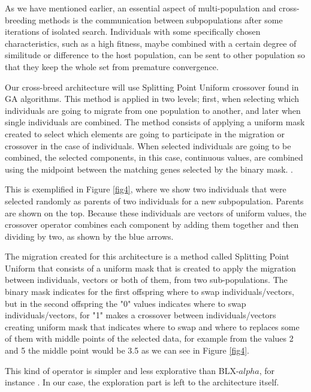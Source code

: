 \documentclass[runningheads]{llncs}
\begin{document}
As we have mentioned earlier, an essential aspect of multi-population
and cross-breeding methods is
the communication between subpopulations after some iterations of isolated
search. Individuals with some specifically chosen characteristics,
such as a high fitness, maybe combined with a certain degree of
similitude or difference to the host population, can be sent to other
population so that they keep the whole set from premature
convergence.

Our cross-breed architecture will use Splitting Point Uniform crossover found in GA
algorithms. %
This method is applied in two levels; first, when selecting which
individuals are going to migrate from one population to another, and later when
single individuals are combined. The method consists of applying a uniform mask
created to select which elements are going to participate in the migration or
crossover in the case of individuals. When selected individuals are going to be
combined, the selected components, in this case, continuous values, are combined
using the midpoint between the matching genes selected by the binary mask.
\cite{Kramer2017,Kaya2011}.

This is exemplified in Figure \ref{fig4}, where we show
two individuals that were selected randomly as parents of two individuals for a
new subpopulation. Parents are shown on the top. Because these individuals are
vectors of uniform values, the crossover operator combines each component by
adding them together and then dividing by two, as shown by the blue arrows.  

The migration created for %
this architecture is a method called Splitting Point
Uniform that consists of a uniform mask that is created to apply the migration
between individuals, vectors or both of them, from two sub-populations. 
The binary mask indicates for the first offspring where to swap individuals/vectors, 
but in the second offspring the "0" values indicates where to swap individuals/vectors, for "1" 
 makes a crossover between individuals/vectors creating uniform mask that indicates where to swap and where to 
 replaces some of them with middle points of the selected data, for example from the values 
 2 and 5 the middle point would be 3.5 as we can see in Figure \ref{fig4}.

This kind of operator is simpler and less explorative than
BLX-$alpha$, for instance \cite{picek2013recombination}. In our case,
the exploration part is left to the architecture itself.
\end{document}
